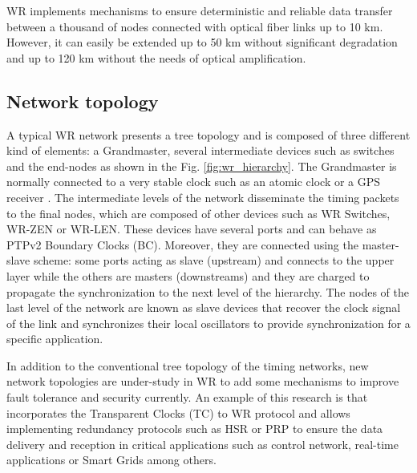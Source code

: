 WR implements mechanisms to ensure deterministic and reliable data transfer 
between a thousand of nodes connected with  optical fiber links up to 10 km. 
However, it can easily be extended up to 50 km without significant degradation 
and up to 120 km without the needs of optical amplification. 

\subsection{Network topology} 
\label{subsec:wr-net}

A typical WR network presents a tree topology and is composed of three different kind of elements: a Grandmaster, several intermediate devices such as switches and the end-nodes as shown in the Fig. \ref{fig:wr_hierarchy}. The Grandmaster is normally connected to a very stable clock such as an atomic clock or a GPS receiver \cite{Daniluk2012}. The intermediate levels of the network disseminate the timing packets to the final nodes, which are composed of other devices such as WR Switches, WR-ZEN or WR-LEN. These devices have several ports and can behave as PTPv2 Boundary Clocks (BC). Moreover, they are connected using the master-slave scheme: some ports acting as slave (upstream) and connects to the upper layer while the others are masters (downstreams) and they are charged to propagate the synchronization to the next level of the hierarchy. The nodes of the last level of the network are known as slave devices that recover the clock signal of the link and synchronizes their local oscillators to provide synchronization for a specific application.

In addition to the conventional tree topology of the timing networks, new network topologies are under-study in WR to add some mechanisms to improve fault tolerance and security currently. An example of this research is \cite{jlgutierrez-paper-redundancy} that incorporates the Transparent Clocks (TC) to WR protocol and allows implementing redundancy protocols such as HSR or PRP to ensure the data delivery and reception in critical applications such as control network, real-time applications or Smart Grids among others.

